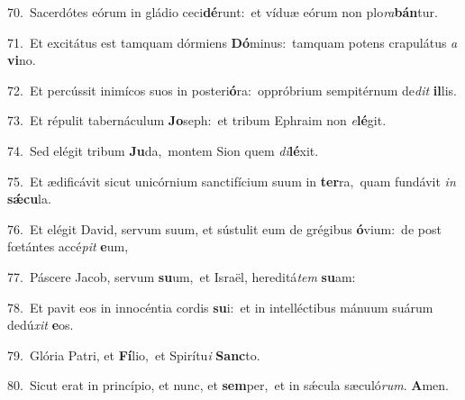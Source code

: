 {\numbfont\textcolor{\numbcolor}{70.}}~Sacerdótes eórum in gládio ceci\-\textbf{dé}\-runt:~\star et víduæ eórum non plo\-\textit{ra}\-\textbf{bán}tur.\par
{\numbfont\textcolor{\numbcolor}{71.}}~Et excitátus est tamquam dórmiens \textbf{Dó}\-minus:~\star tamquam potens crapulátus \textit{a} \textbf{vi}\-no.\par
{\numbfont\textcolor{\numbcolor}{72.}}~Et percússit inimícos suos in posteri\-\textbf{ó}\-ra:~\star oppróbrium sempitérnum de\textit{dit} \textbf{il}\-lis.\par
{\numbfont\textcolor{\numbcolor}{73.}}~Et répulit tabernáculum \textbf{Jo}\-seph:~\star et tribum Ephraim non \textit{e}\-\textbf{lé}git.\par
{\numbfont\textcolor{\numbcolor}{74.}}~Sed elégit tribum \textbf{Ju}\-da,~\star montem Sion quem \textit{di}\-\textbf{lé}xit.\par
{\numbfont\textcolor{\numbcolor}{75.}}~Et ædificávit sicut unicórnium sanctifícium suum in \textbf{ter}\-ra,~\star quam fundávit \textit{in} \textbf{sǽ}\-\textbf{cu}la.\par
{\numbfont\textcolor{\numbcolor}{76.}}~Et elégit David, servum suum, et sústulit eum de grégibus \textbf{ó}\-vium:~\star de post fœtántes accé\textit{pit} \textbf{e}\-um,\par
{\numbfont\textcolor{\numbcolor}{77.}}~Páscere Jacob, servum \textbf{su}\-um,~\star et Israël, hereditá\textit{tem} \textbf{su}\-am:\par
{\numbfont\textcolor{\numbcolor}{78.}}~Et pavit eos in innocéntia cordis \textbf{su}\-i:~\star et in intelléctibus mánuum suárum dedú\textit{xit} \textbf{e}\-os.\par
{\numbfont\textcolor{\numbcolor}{79.}}~Glória Patri, et \textbf{Fí}\-lio,~\star et Spirítu\textit{i} \textbf{Sanc}\-to.\par
{\numbfont\textcolor{\numbcolor}{80.}}~Sicut erat in princípio, et nunc, et \textbf{sem}\-per,~\star et in sǽcula sæculó\-\textit{rum}\-. \textbf{A}\-men.\par

